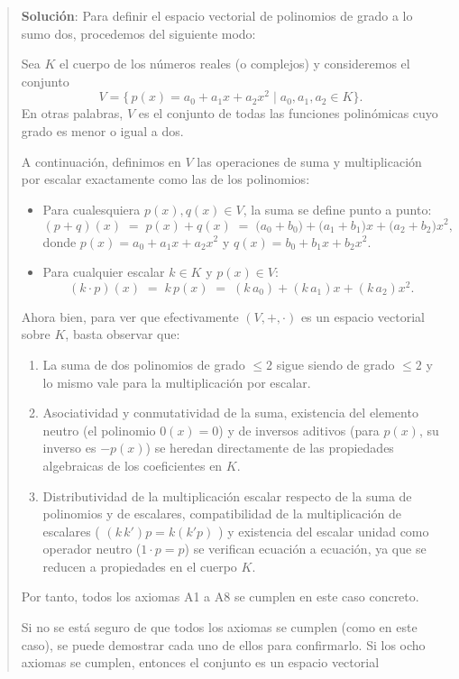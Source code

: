 \begin{quote}

  \textbf{Solución}: Para definir el espacio vectorial de polinomios de grado a lo sumo dos, procedemos del siguiente modo:

  Sea \(K\) el cuerpo de los números reales (o complejos) y consideremos el conjunto
  \[
  V = \bigl\{\,p(x) = a_0 + a_1x + a_2x^2 \;\big|\; a_0,a_1,a_2 \in K\bigr\}.
  \]
  En otras palabras, \(V\) es el conjunto de todas las funciones polinómicas cuyo grado es menor o igual a dos.

  A continuación, definimos en \(V\) las operaciones de suma y multiplicación por escalar exactamente como las de los polinomios:
  \begin{itemize}
    \item Para cualesquiera \(p(x),q(x)\in V\), la suma se define punto a punto:
    \[
      (p+q)(x) \;=\; p(x)+q(x) \;=\; \bigl(a_0+b_0\bigr) + \bigl(a_1+b_1\bigr)x + \bigl(a_2+b_2\bigr)x^2,
    \]
    donde \(p(x)=a_0+a_1x+a_2x^2\) y \(q(x)=b_0+b_1x+b_2x^2\).

  \item Para cualquier escalar \(k\in K\) y \(p(x)\in V\):
    \[
      (k\cdot p)(x) \;=\; k\,p(x) \;=\; (k\,a_0) + (k\,a_1)x + (k\,a_2)x^2.
    \]
  \end{itemize}

  Ahora bien, para ver que efectivamente \((V,+,\cdot)\) es un espacio vectorial sobre \(K\), basta observar que:
  \begin{enumerate}
    \item La suma de dos polinomios de grado \(\le2\) sigue siendo de grado \(\le2\) y lo mismo vale para la multiplicación por escalar.

    \item Asociatividad y conmutatividad de la suma, existencia del elemento neutro (el polinomio \(0(x)=0\)) y de inversos aditivos (para \(p(x)\), su inverso es \(-p(x)\)) se heredan directamente de las propiedades algebraicas de los coeficientes en \(K\).

    \item Distributividad de la multiplicación escalar respecto de la suma de polinomios y de escalares, compatibilidad de la multiplicación de escalares ( \((k\,k')p = k(k'p)\) ) y existencia del escalar unidad como operador neutro (\(1\cdot p = p\)) se verifican ecuación a ecuación, ya que se reducen a propiedades en el cuerpo \(K\).
  \end{enumerate}

  Por tanto, todos los axiomas A1 a A8 se cumplen en este caso concreto.
  \begin{tcolorbox}[myconclusion]
    Si no se está seguro de que todos los axiomas se cumplen (como en este caso), se puede demostrar cada uno de ellos para confirmarlo. Si los ocho axiomas se cumplen, entonces el conjunto es un espacio vectorial
  \end{tcolorbox}
\end{quote}

